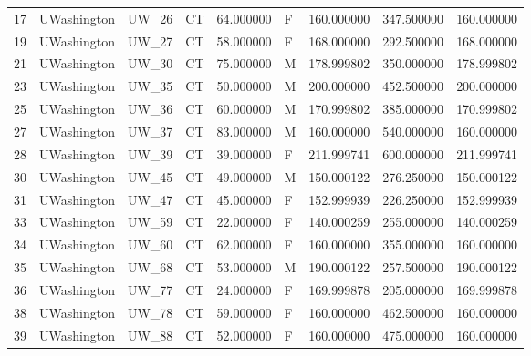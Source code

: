 \begin{tabular}{llllrlrrr}
17     &     UWashington &        UW\_26 &                 CT &  64.000000 &        F &       160.000000 &    347.500000 &  160.000000 \\
19     &     UWashington &        UW\_27 &                 CT &  58.000000 &        F &       168.000000 &    292.500000 &  168.000000 \\
21     &     UWashington &        UW\_30 &                 CT &  75.000000 &        M &       178.999802 &    350.000000 &  178.999802 \\
23     &     UWashington &        UW\_35 &                 CT &  50.000000 &        M &       200.000000 &    452.500000 &  200.000000 \\
25     &     UWashington &        UW\_36 &                 CT &  60.000000 &        M &       170.999802 &    385.000000 &  170.999802 \\
27     &     UWashington &        UW\_37 &                 CT &  83.000000 &        M &       160.000000 &    540.000000 &  160.000000 \\
28     &     UWashington &        UW\_39 &                 CT &  39.000000 &        F &       211.999741 &    600.000000 &  211.999741 \\
30     &     UWashington &        UW\_45 &                 CT &  49.000000 &        M &       150.000122 &    276.250000 &  150.000122 \\
31     &     UWashington &        UW\_47 &                 CT &  45.000000 &        F &       152.999939 &    226.250000 &  152.999939 \\
33     &     UWashington &        UW\_59 &                 CT &  22.000000 &        F &       140.000259 &    255.000000 &  140.000259 \\
34     &     UWashington &        UW\_60 &                 CT &  62.000000 &        F &       160.000000 &    355.000000 &  160.000000 \\
35     &     UWashington &        UW\_68 &                 CT &  53.000000 &        M &       190.000122 &    257.500000 &  190.000122 \\
36     &     UWashington &        UW\_77 &                 CT &  24.000000 &        F &       169.999878 &    205.000000 &  169.999878 \\
38     &     UWashington &        UW\_78 &                 CT &  59.000000 &        F &       160.000000 &    462.500000 &  160.000000 \\
39     &     UWashington &        UW\_88 &                 CT &  52.000000 &        F &       160.000000 &    475.000000 &  160.000000 \\

\end{tabular}
